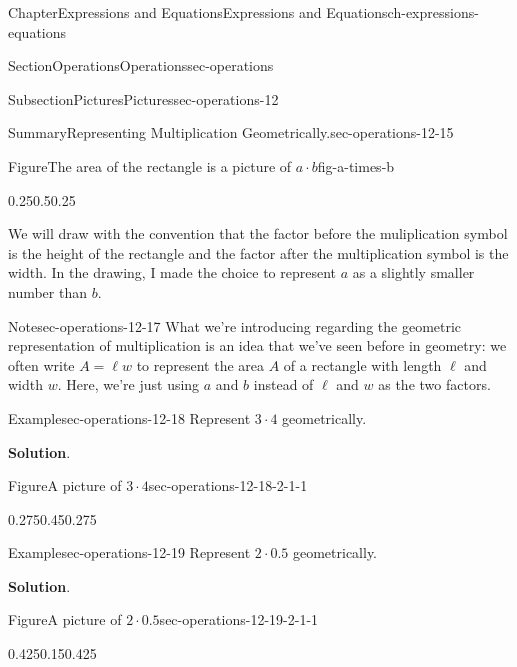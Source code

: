 \documentclass[twoside,11pt,]{book}
\newcommand{\blocktitlefont}{\relax}
\numberwithin{equation}{chapter}
\begin{document}
\begin{chapterptx}{Chapter}{Expressions and Equations}{}{Expressions and Equations}{}{}{ch-expressions-equations}
\begin{sectionptx}{Section}{Operations}{}{Operations}{}{}{sec-operations}
\begin{subsectionptx}{Subsection}{Pictures}{}{Pictures}{}{}{sec-operations-12}
\begin{assemblage}{Summary}{Representing Multiplication Geometrically.}{sec-operations-12-15}
\begin{figureptx}{Figure}{The area of the rectangle is a picture of \(a \cdot b\)}{fig-a-times-b}{}
\begin{image}{0.25}{0.5}{0.25}{}
%
\end{image}%
\tcblower
\end{figureptx}%
%
\end{assemblage}
We will draw with the convention that the factor before the muliplication symbol is the height of the rectangle and the factor after the multiplication symbol is the width. In the drawing, I made the choice to represent \(a\) as a slightly smaller number than \(b\).%
\begin{note}{Note}{}{sec-operations-12-17}%
What we're introducing regarding the geometric representation of multiplication is an idea that we've seen before in geometry: we often write \(A = \ell w\) to represent the area \(A\) of a rectangle with length \(\ell\) and width \(w\). Here, we're just using \(a\) and \(b\) instead of \(\ell\) and \(w\) as the two factors.%
\end{note}
\begin{example}{Example}{}{sec-operations-12-18}%
Represent \(3 \cdot 4\) geometrically.%
\par\smallskip%
\noindent\textbf{\blocktitlefont Solution}.\hypertarget{sec-operations-12-18-2}{}\quad{}\begin{figureptx}{Figure}{A picture of \(3 \cdot 4\)}{sec-operations-12-18-2-1-1}{}%
\begin{image}{0.275}{0.45}{0.275}{}%
%
\end{image}%
\tcblower
\end{figureptx}%
%
\end{example}
\begin{example}{Example}{}{sec-operations-12-19}%
Represent \(2 \cdot 0.5\) geometrically.%
\par\smallskip%
\noindent\textbf{\blocktitlefont Solution}.\hypertarget{sec-operations-12-19-2}{}\quad{}\begin{figureptx}{Figure}{A picture of \(2 \cdot 0.5\)}{sec-operations-12-19-2-1-1}{}%
\begin{image}{0.425}{0.15}{0.425}{}%
\resizebox{\linewidth}{!}{%
\begin{tikzpicture}

\end{tikzpicture}}
\end{image}
\end{figureptx}
\end{example}
\end{subsectionptx}
\end{sectionptx}
\end{chapterptx}
\end{document}
